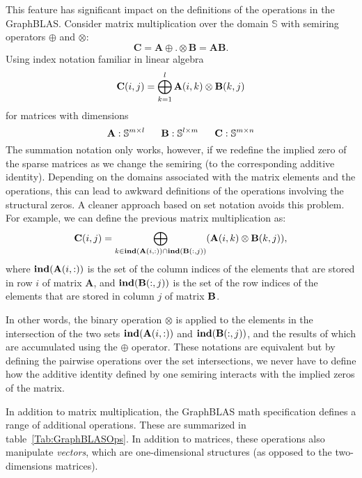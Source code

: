 This feature has significant impact on the definitions of the operations in the GraphBLAS.   
Consider matrix multiplication over the domain $\mathbb{S}$ 
with semiring operators 
$\oplus$ and $\otimes$:
 $$
   \mathbf{C} = \mathbf{A} {\oplus}.{\otimes} \mathbf{B} = \mathbf{A} \mathbf{B}.
$$
Using index notation familiar in linear algebra
  $$
   {\bf C}(i,j) = \bigoplus_{k=1}^l {\bf A}(i,k) \otimes {\bf B}(k,j)
  $$
for matrices with dimensions
$$
  {\bf A} : \mathbb{S}^{m \times l} ~~~~~
  {\bf B} : \mathbb{S}^{l \times m} ~~~~~
  {\bf C} : \mathbb{S}^{m \times n}
$$
The summation notation only works, however, if we redefine the implied zero of the 
sparse matrices as we change the semiring (to the corresponding additive identity).   
Depending on the domains associated with the
matrix elements and the operations, this can lead to awkward definitions of the
operations involving the structural zeros.  A cleaner approach based on set notation
avoids this problem.  For example, we can define the previous matrix multiplication
as:   
$$
\mathbf{C}(i,j)
= \bigoplus_{k \in \mathbf{ind}({\bf {A}}(i,:)) \cap
\mathbf{ind}({\bf {B}}(:,j))} ({\bf {A}}(i,k)
\otimes {\bf {B}}(k,j)),
$$ 
where $\mathbf{ind}({\bf {A}}(i,:))$ is the set of the column indices of the 
elements that are stored in row $i$ of matrix $\mathbf{A}$, and
$\mathbf{ind}({\bf {B}}(:,j))$ is the set of the row indices of the 
elements that are stored in column $j$ of matrix ${\bf B}$.

In other words, the binary operation $\otimes$ is applied to the elements in the intersection of the 
two sets $\mathbf{ind}({\bf {A}}(i,:))$ and $\mathbf{ind}({\bf {B}}(:,j))$, 
and the results of which are accumulated using the $\oplus$ operator.
These notations are equivalent but by defining the pairwise operations over
the set intersections, we never have to define how the additive identity defined by one
semiring interacts with the implied zeros of the matrix.

In addition to matrix multiplication, the GraphBLAS math specification defines
a range of additional operations.  These are summarized in table~\ref{Tab:GraphBLASOps}.
In addition to matrices, these operations also manipulate \emph{vectors}, which are
one-dimensional structures (as opposed to the two-dimensions matrices).


